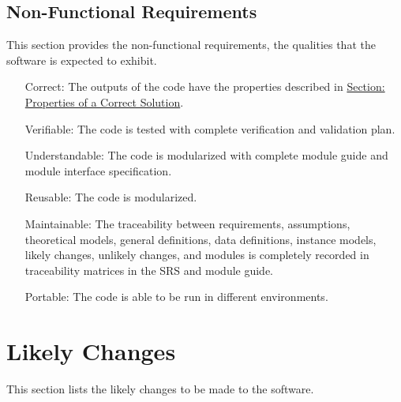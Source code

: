 \documentclass[12pt]{article}
\begin{document}
\subsection{Non-Functional Requirements}
\label{Sec:NFRs}
This section provides the non-functional requirements, the qualities that the software is expected to exhibit.

\begin{itemize}
\item[Correct:\phantomsection\label{correct}]{The outputs of the code have the properties described in \hyperref[Sec:CorSolProps]{Section: Properties of a Correct Solution}.}
\item[Verifiable:\phantomsection\label{verifiable}]{The code is tested with complete verification and validation plan.}
\item[Understandable:\phantomsection\label{understandable}]{The code is modularized with complete module guide and module interface specification.}
\item[Reusable:\phantomsection\label{reusable}]{The code is modularized.}
\item[Maintainable:\phantomsection\label{maintainable}]{The traceability between requirements, assumptions, theoretical models, general definitions, data definitions, instance models, likely changes, unlikely changes, and modules is completely recorded in traceability matrices in the SRS and module guide.}
\item[Portable:\phantomsection\label{portable}]{The code is able to be run in different environments.}
\end{itemize}
\section{Likely Changes}
\label{Sec:LCs}
This section lists the likely changes to be made to the software.
\end{document}
